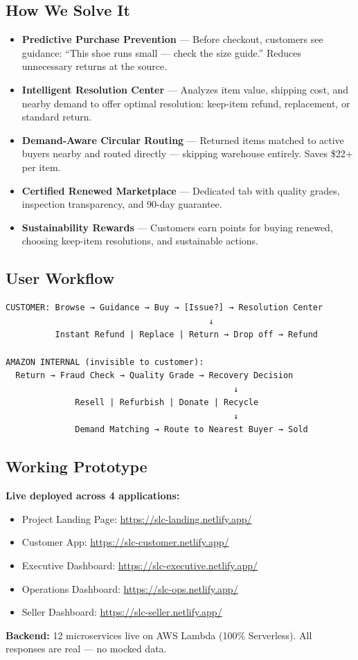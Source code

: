\documentclass[11pt,a4paper]{article}
\begin{document}
\subsection{How We Solve It}
\begin{itemize}[noitemsep]
\item \textbf{Predictive Purchase Prevention} --- Before checkout, customers see guidance: ``This shoe runs small --- check the size guide.'' Reduces unnecessary returns at the source.
\item \textbf{Intelligent Resolution Center} --- Analyzes item value, shipping cost, and nearby demand to offer optimal resolution: keep-item refund, replacement, or standard return.
\item \textbf{Demand-Aware Circular Routing} --- Returned items matched to active buyers nearby and routed directly --- skipping warehouse entirely. Saves \$22+ per item.
\item \textbf{Certified Renewed Marketplace} --- Dedicated tab with quality grades, inspection transparency, and 90-day guarantee.
\item \textbf{Sustainability Rewards} --- Customers earn points for buying renewed, choosing keep-item resolutions, and sustainable actions.
\end{itemize}

\subsection{User Workflow}
\begin{verbatim}
CUSTOMER: Browse → Guidance → Buy → [Issue?] → Resolution Center
                                         ↓
          Instant Refund | Replace | Return → Drop off → Refund

AMAZON INTERNAL (invisible to customer):
  Return → Fraud Check → Quality Grade → Recovery Decision
                                              ↓
              Resell | Refurbish | Donate | Recycle
                                              ↓
              Demand Matching → Route to Nearest Buyer → Sold
\end{verbatim}

\subsection{Working Prototype}
\textbf{Live deployed across 4 applications:}
\begin{itemize}[noitemsep]
\item Project Landing Page: \url{https://slc-landing.netlify.app/}
\item Customer App: \url{https://slc-customer.netlify.app/}
\item Executive Dashboard: \url{https://slc-executive.netlify.app/}
\item Operations Dashboard: \url{https://slc-ops.netlify.app/}
\item Seller Dashboard: \url{https://slc-seller.netlify.app/}
\end{itemize}
\textbf{Backend:} 12 microservices live on AWS Lambda (100\% Serverless). All responses are real --- no mocked data.
\end{document}
